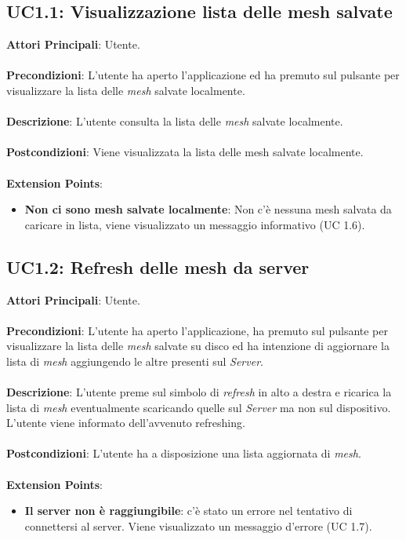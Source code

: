 \subsection{UC1.1: Visualizzazione lista delle mesh salvate}
\textbf{Attori Principali}: Utente.
\\\\ \textbf{Precondizioni}: L'utente ha aperto l'applicazione ed ha premuto sul pulsante per visualizzare la lista delle \emph{mesh} salvate localmente.
\\\\ \textbf{Descrizione}:  L'utente consulta la lista delle \emph{mesh} salvate localmente.
\\\\ \textbf{Postcondizioni}: Viene visualizzata la lista delle mesh salvate localmente.
\\\\ \textbf{Extension Points}:
\begin{itemize}
\item \textbf{Non ci sono mesh salvate localmente}: Non c'è nessuna mesh salvata da caricare in lista, viene visualizzato un messaggio informativo (UC 1.6).
\end{itemize}

\subsection{UC1.2: Refresh delle mesh da server}
\textbf{Attori Principali}: Utente.
\\\\ \textbf{Precondizioni}: L'utente ha aperto l'applicazione, ha premuto sul pulsante per visualizzare la lista delle \emph{mesh} salvate su disco ed ha intenzione di aggiornare la lista di \emph{mesh} aggiungendo le altre presenti sul \emph{Server}.
\\\\ \textbf{Descrizione}: L'utente preme sul simbolo di \emph{refresh} in alto a destra e ricarica la lista di \emph{mesh} eventualmente scaricando quelle sul \emph{Server} ma non sul dispositivo. L'utente viene informato dell'avvenuto refreshing.
\\\\ \textbf{Postcondizioni}: L'utente ha a disposizione una lista aggiornata di \emph{mesh}.
\\\\ \textbf{Extension Points}:
\begin{itemize}
\item \textbf{Il server non è raggiungibile}: c'è stato un errore nel tentativo di connettersi al server. Viene visualizzato un messaggio d'errore (UC 1.7).
\end{itemize}

